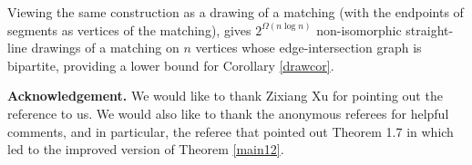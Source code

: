 \documentclass[11pt]{article}
\theoremstyle{plain}
\theoremstyle{definition}
\theoremstyle{remark}
\begin{document}
Viewing the same construction as a drawing of a matching (with the endpoints of segments as vertices of the matching), gives $2^{\Omega(n \log n)}$ non-isomorphic straight-line drawings of a matching on $n$ vertices whose edge-intersection graph is bipartite, providing a lower bound for Corollary \ref{drawcor}. 






\medskip


\noindent \textbf{Acknowledgement.}  We would like to thank Zixiang Xu for pointing out the reference \cite{alon2} to us.  We would also like to thank the anonymous referees for helpful comments, and in particular, the referee that pointed out Theorem 1.7 in \cite{P} which led to the improved version of Theorem \ref{main12}.
\end{document}
